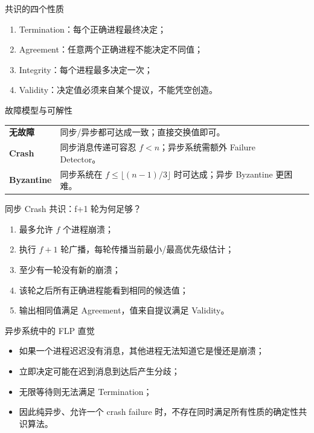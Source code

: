 \documentclass[UTF8,fontset=none,aspectratio=169,10pt]{beamer}
\begin{document}
\begin{frame}{共识的四个性质}
\begin{enumerate}
  \item Termination：每个正确进程最终决定；
  \item Agreement：任意两个正确进程不能决定不同值；
  \item Integrity：每个进程最多决定一次；
  \item Validity：决定值必须来自某个提议，不能凭空创造。
\end{enumerate}
\vfill
{}
\end{frame}


\begin{frame}{故障模型与可解性}
\begin{tabularx}{\linewidth}{>{\bfseries}p{2.6cm}XX}
\toprule
无故障 & 同步/异步都可达成一致；直接交换值即可。 \\
Crash & 同步消息传递可容忍 $f<n$；异步系统需额外 Failure Detector。 \\
Byzantine & 同步系统在 $f\le\lfloor(n-1)/3\rfloor$ 时可达成；异步 Byzantine 更困难。 \\
\bottomrule
\end{tabularx}
\vfill
{}
\end{frame}

\begin{frame}{同步 Crash 共识：f+1 轮为何足够？}
\begin{enumerate}
  \item 最多允许 $f$ 个进程崩溃；
  \item 执行 $f+1$ 轮广播，每轮传播当前最小/最高优先级估计；
  \item 至少有一轮没有新的崩溃；
  \item 该轮之后所有正确进程能看到相同的候选值；
  \item 输出相同值满足 Agreement，值来自提议满足 Validity。
\end{enumerate}
\end{frame}

\begin{frame}{异步系统中的 FLP 直觉}
\begin{itemize}
  \item 如果一个进程迟迟没有消息，其他进程无法知道它是慢还是崩溃；
  \item 立即决定可能在迟到消息到达后产生分歧；
  \item 无限等待则无法满足 Termination；
  \item 因此纯异步、允许一个 crash failure 时，不存在同时满足所有性质的确定性共识算法。
\end{itemize}
\vfill
{}
\end{frame}
\end{document}
